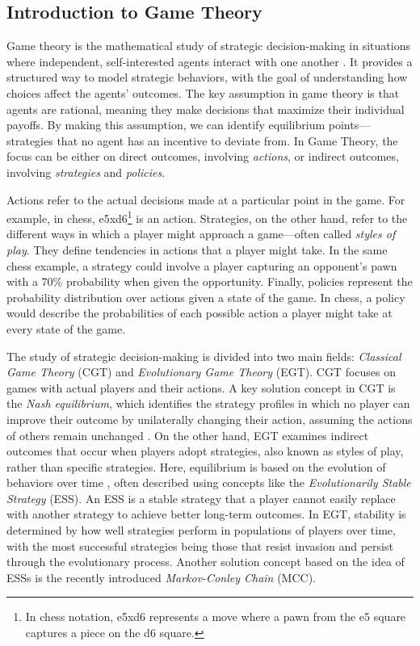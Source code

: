 \subsection{Introduction to Game Theory}

    Game theory is the mathematical study of strategic decision-making in situations where independent, self-interested agents interact with one another \cite{Shoham_Leyton-Brown_2008}. It provides a structured way to model strategic behaviors, with the goal of understanding how choices affect the agents' outcomes. The key assumption in game theory is that agents are rational, meaning they make decisions that maximize their individual payoffs. By making this assumption, we can identify equilibrium points—strategies that no agent has an incentive to deviate from. In Game Theory, the focus can be either on direct outcomes, involving \emph{actions}, or indirect outcomes, involving \emph{strategies} and \emph{policies}.\tinydouble

    \noindent
    Actions refer to the actual decisions made at a particular point in the game. For example, in chess, e5xd6\footnote{In chess notation, e5xd6 represents a move where a pawn from the e5 square captures a piece on the d6 square.} is an action. Strategies, on the other hand, refer to the different ways in which a player might approach a game—often called \emph{styles of play}. They define tendencies in actions that a player might take. In the same chess example, a strategy could involve a player capturing an opponent's pawn with a 70\% probability when given the opportunity. Finally, policies represent the probability distribution over actions given a state of the game. In chess, a policy would describe the probabilities of each possible action a player might take at every state of the game.\tinydouble

    \noindent
    The study of strategic decision-making is divided into two main fields: \emph{Classical Game Theory} (CGT) and \emph{Evolutionary Game Theory} (EGT). CGT focuses on games with actual players and their actions. A key solution concept in CGT is the \emph{Nash equilibrium}, which identifies the strategy profiles in which no player can improve their outcome by unilaterally changing their action, assuming the actions of others remain unchanged \cite{doi:10.1073/pnas.36.1.48}. On the other hand, EGT examines indirect outcomes that occur when players adopt strategies, also known as styles of play, rather than specific strategies. Here, equilibrium is based on the evolution of behaviors over time \cite{Szab__2007}, often described using concepts like the \emph{Evolutionarily Stable Strategy} (ESS). An ESS is a stable strategy that a player cannot easily replace with another strategy to achieve better long-term outcomes. In EGT, stability is determined by how well strategies perform in populations of players over time, with the most successful strategies being those that resist invasion and persist through the evolutionary process. Another solution concept based on the idea of ESSs is the recently introduced \emph{Markov-Conley Chain} (MCC).\tinydouble

